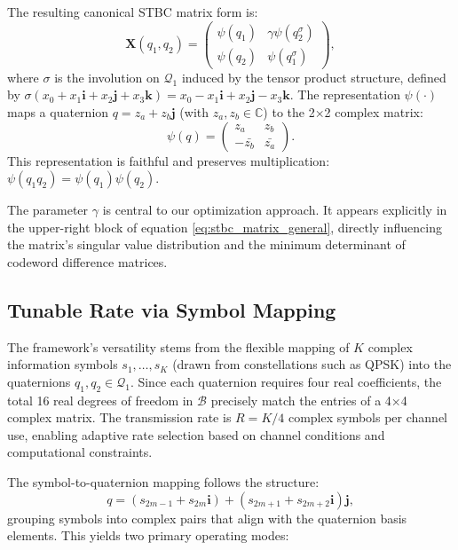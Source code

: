 The resulting canonical STBC matrix form is:
\begin{equation} \label{eq:stbc_matrix_general}
\mathbf{X}(q_1, q_2) = 
\begin{pmatrix}
\psi(q_1) & \gamma \psi(q_2^{\sigma}) \\
\psi(q_2) & \psi(q_1^{\sigma})
\end{pmatrix},
\end{equation}
where $\sigma$ is the involution on $\mathcal{Q}_1$ induced by the tensor product structure, defined by $\sigma(x_0 + x_1 \mathbf{i} + x_2 \mathbf{j} + x_3 \mathbf{k}) = x_0 - x_1 \mathbf{i} + x_2 \mathbf{j} - x_3 \mathbf{k}$. The representation $\psi(\cdot)$ maps a quaternion $q = z_a + z_b \mathbf{j}$ (with $z_a, z_b \in \mathbb{C}$) to the 2×2 complex matrix:
\begin{equation}
\psi(q) = \begin{pmatrix} z_a & z_b \\ -\bar{z_b} & \bar{z_a} \end{pmatrix}.
\end{equation}
This representation is faithful and preserves multiplication: $\psi(q_1 q_2) = \psi(q_1) \psi(q_2)$.

The parameter $\gamma$ is central to our optimization approach. 
It appears explicitly in the upper-right block of equation \eqref{eq:stbc_matrix_general}, directly influencing the matrix's singular value distribution and the minimum determinant of codeword difference matrices.

\subsection{Tunable Rate via Symbol Mapping}

The framework's versatility stems from the flexible mapping of $K$ complex information symbols $s_1, \ldots, s_K$ (drawn from constellations such as QPSK) into the quaternions $q_1, q_2 \in \mathcal{Q}_1$. Since each quaternion requires four real coefficients, the total 16 real degrees of freedom in $\mathcal{B}$ precisely match the entries of a 4×4 complex matrix. The transmission rate is $R = K/4$ complex symbols per channel use, enabling adaptive rate selection based on channel conditions and computational constraints.

The symbol-to-quaternion mapping follows the structure:
\begin{equation}
q = (s_{2m-1} + s_{2m} \mathbf{i}) + (s_{2m+1} + s_{2m+2} \mathbf{i}) \mathbf{j},
\end{equation}
grouping symbols into complex pairs that align with the quaternion basis elements. This yields two primary operating modes:

